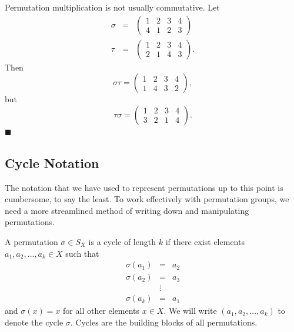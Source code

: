  
\vspace{2ex}
 
 
Permutation multiplication is not usually commutative. Let
\begin{eqnarray*}
\sigma
& = &
\left(
\begin{array}{cccc}
1 & 2 & 3 & 4  \\
4 & 1 & 2 & 3
\end{array}
\right) \\
\tau
& = &
\left(
\begin{array}{cccc}
1 & 2 & 3 & 4 \\
2 & 1 & 4 & 3
\end{array}
\right).
\end{eqnarray*}
Then
$$
\sigma \tau
=
\left(
\begin{array}{cccc}
1 & 2 & 3 & 4 \\
1 & 4 & 3 & 2
\end{array}
\right),
$$
but
$$
\tau \sigma
=
\left(
\begin{array}{cccc}
1 & 2 & 3 & 4 \\
3 & 2 & 1 & 4
\end{array}
\right).
$$
\hspace{\fill} $\blacksquare$
 
 
\subsection*{Cycle Notation}
 
 
The notation that we have used to represent permutations up to this
point is cumbersome, to say the least.  To work effectively with
permutation groups, we need a more streamlined method of writing
down and manipulating permutations.
 
 
A permutation $\sigma \in S_X$ is a {\bfi cycle of
length}
$k$ if there exist elements $a_1, a_2, \ldots, a_k \in X$ such that 
\begin{eqnarray*}
\sigma( a_1 ) & = & a_2 \\
\sigma( a_2 ) & = & a_3 \\
              & \vdots &  \\
\sigma( a_k ) & = & a_1
\end{eqnarray*}
and $\sigma( x) =x$ for all other elements $x \in X$. We will write
$(a_1, a_2, \ldots, a_k )$\label{notecycle} to denote the cycle 
$\sigma$. Cycles are the building blocks of all permutations.
 
 
\vspace{2ex}
 
